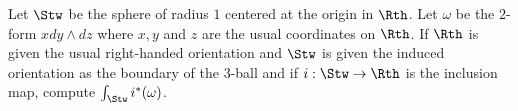 Let $\Stw$ be the sphere of radius $1$ centered at the origin in
$\Rth$.  Let $\omega$ be the $2$-form $x dy\wedge dz$ where $x,y$ and
$z$ are the usual coordinates on $\Rth$. If $\Rth$ is given the usual
right-handed orientation and $\Stw$ is given the induced orientation
as the boundary of the $3$-ball and if $i:\Stw\rightarrow \Rth$ is the
inclusion map, compute $\int_{\Stw}i^*(\omega)$.

